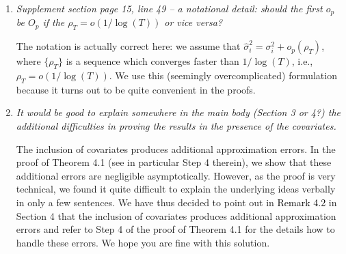 \documentclass[a4paper,12pt]{article}
\newcommand{\reference}[1]{\textcolor{black}{#1}}
\begin{document}
\begin{enumerate}[label=\arabic*.,leftmargin=0.6cm]


\item \textit{Supplement section page 15, line 49 -- a notational detail: should the first $o_p$ be $O_p$ if the $\rho_T = o(1/ \log(T))$ or vice versa?}  

The notation is actually correct here: we assume that $\widehat{\sigma}_i^2 = \sigma_i^2 + o_p(\rho_T)$, where $\{ \rho_T\}$ is a sequence which converges faster than $1/\log(T)$, i.e., $\rho_T = o(1/ \log (T))$. We use this (seemingly overcomplicated) formulation because it turns out to be quite convenient in the proofs. 


\item \textit{It would be good to explain somewhere in the main body (Section 3 or 4?) the additional difficulties in proving the results in the presence of the covariates.}
  
The inclusion of covariates produces additional approximation errors. In the proof of Theorem 4.1 (see in particular Step 4 therein), we show that these additional errors are negligible asymptotically. However, as the proof is very technical, we found it quite difficult to explain the underlying ideas verbally in only a few sentences. We have thus decided to point out in \reference{Remark 4.2} in Section 4 that the inclusion of covariates produces additional approximation errors and refer to Step 4 of the proof of Theorem 4.1 for the details how to handle these errors. We hope you are fine with this solution.  
  
\end{enumerate}



\pagebreak
\vspace{10pt}

{\small
\setlength{\bibsep}{0.55em}
}
\end{document}
